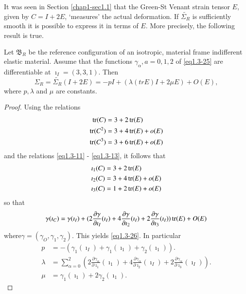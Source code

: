 It was seen in Section \ref{chap1-sec1.1} that the Green-St
Venant strain tensor
$E$, given by $C = I + 2E$, `measures' the actual deformation. If
$\tilde{\Sigma_R}$ is sufficiently smooth it is possible to express it
in terms of $E$. More precisely, the following result is true.  

\begin{theorem}\label{chap1-thm1.3.6}%
  Let $\mathfrak{B}_R$ be the reference configuration of an isotropic,
  material frame indifferent elastic material. Assume that the functions
  $\gamma_{\alpha}, a = 0, 1, 2$ of \eqref{eq1.3-25} are differentiable at
  $\imath_I = (3, 3, 1)$. Then 
  \begin{equation*}
    \Sigma_R = \tilde{\Sigma_R}(I + 2E) = - pI + (\lambda(trE)I + 2\mu E)
    + O(E), \tag{1.3-26} \label{eq1.3-26}
  \end{equation*}
  where $p, \lambda$ and $\mu$ are constants. 
\end{theorem}

\begin{proof} %
Using the relations
\begin{align*}
\operatorname{tr}(C) & = 3 + 2\operatorname{tr}(E)\\
\operatorname{tr}(C^2) & = 3 + 4\operatorname{tr}(E) + o(E)\\
\operatorname{tr}(C^3) & = 3 + 6\operatorname{tr}(E) + o(E)
\end{align*}
and the relations \eqref{eq1.3-11} - \eqref{eq1.3-13}, it follows that 
\begin{align*}
\imath_1(C) & = 3 + 2\operatorname{tr}(E)\\
\imath_2(C) & = 3 + 4\operatorname{tr}(E) + o(E)\\
\imath_3(C) & = 1 + 2\operatorname{tr}(E) + o(E)
\end{align*}
so that
$$
\gamma(\imath_C) = \gamma(\imath_I) + (2
\frac{\partial\gamma}{\partial \imath_I} 
(\imath_I) + 4 \frac{\partial \gamma}{\partial \imath_2} (\imath_I)+ 2
\frac{\partial 
  \gamma}{\partial \imath_3} (\imath_I)) \operatorname{tr}(E) + O(E) 
$$
where\pageoriginale $\gamma = (\gamma_O, \gamma_1, \gamma_2)$. This yields
\eqref{eq1.3-26}. In particular 
\begin{align*}
  p & = - (\gamma_1 (\imath_I) + \gamma_1 (\imath_1) + \gamma_2
  (\imath_1)). \tag{1.3-27}\label{eq1.3-27}\\ 
  \lambda & = \sum_{\alpha = 0}^2  \left(2\frac{\partial
  \gamma_\alpha}{\partial \imath_1} (\imath_1) + 4 \frac{\partial
  \gamma_\alpha}{\partial \imath_2} (\imath_I) + 2 \frac{\partial
  \gamma_\alpha}{\partial \imath_3}
  (\imath_I)\right). \tag{1.3-28}\label{eq1.3-28}\\
  \mu &= \gamma_1 (\imath_1) + 2\gamma_2
  (\imath_1).\tag{1.3-29}\label{eq1.3-29} 
\end{align*}
\end{proof}

